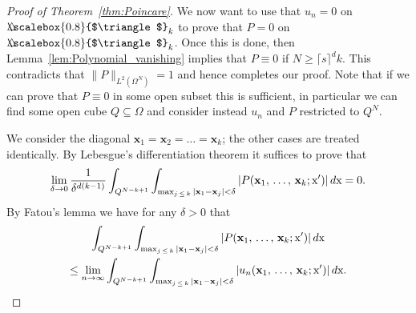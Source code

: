 \documentclass[10pt]{amsart}
\theoremstyle{definition}\newtheorem{defi}[theo]{Definition}\newtheorem{rema}[theo]{Remark}\newtheorem{exam}[theo]{Example}\newtheorem{exem}[theo]{Example}\newtheorem{nota}[theo]{Notation}
\newcommand\1{{\ensuremath {\mathds 1} }}
\newcommand{\bx}{\mathbf{x}}
\newcommand{\sx}{\textup{x}}
\newcommand{\bDelta}{{\mbox{$\triangle$}\hspace{-8.6pt}\scalebox{0.8}{$\triangle$}}}
\begin{document}
\begin{proof}[Proof of Theorem~\ref{thm:Poincare}]
We now want to use that $u_n=0$ on $\bDelta_k$ to prove that $P=0$ on $\bDelta_k$. Once this is done, then Lemma~\ref{lem:Polynomial_vanishing} implies that $P\equiv 0$ if $N \ge \lceil s \rceil^d k$. This contradicts that $\|P\|_{L^2(\Omega^N)}=1$ and hence completes our proof. Note that if we can prove that $P\equiv 0$ in some open subset this is sufficient, in particular we can find some open cube $Q\subseteq \Omega$ and consider instead $u_n$ and $P$ restricted to $Q^N$.


We consider the diagonal $\bx_1=\bx_2=\ldots = \bx_k$; the other cases are treated identically. By Lebesgue's differentiation theorem it suffices to prove that
\begin{equation}\label{eq:Lebesgue_differentiation}
\lim_{\delta\to 0}\frac{1}{\delta^{d(k-1)}}\int_{Q^{N-k+1}}\int_{\max_{j\,\leq\,k}|\bx_1-\bx_j|< \delta}|P(\bx_1, \,\ldots,\,\bx_k; \sx')| \,d\sx =0.
\end{equation}
By Fatou's lemma we have for any $\delta>0$ that
\begin{multline}\label{eq:Fatou_diagonals}
\int_{Q^{N-k+1}}\int_{\max_{j\,\leq\,k}|\bx_1-\bx_j|< \delta}|P(\bx_1,\,\ldots,\,\bx_k; \sx')| \,d\sx\\
\leq
\lim_{n\to \infty}
\int_{Q^{N-k+1}}\int_{\max_{j\,\leq\,k}|\bx_1-\bx_j|< \delta}|u_n(\bx_1,\,\ldots,\,\bx_k; \sx')| \,d\sx.
\end{multline}


\end{proof}
\end{document}

